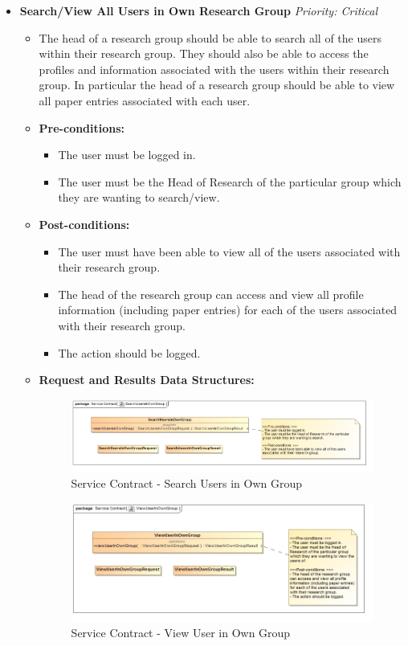 \documentclass{article}
\begin{document}
\begin{itemize}
					\cleardoublepage
					\item \textbf{Search/View All Users in Own Research Group} \hfill \textit{Priority: Critical}
					\begin{itemize}
						\item The head of a research group should be able to search all of the users within their research group. They should also be able to access the profiles and information associated with the users within their research group. In particular the head of a research group should be able to view all paper entries associated with each user.
						\item \textbf{Pre-conditions:}
						\begin{itemize}
							\item The user must be logged in.
							\item The user must be the Head of Research of the particular group which they are wanting to search/view.
						\end{itemize}
						\item \textbf{Post-conditions:}
						\begin{itemize}
							\item The user must have been able to view all of the users associated with their research group.
							\item The head of the research group can access and view all profile information (including paper entries) for each of the users associated with their research group.
							\item The action should be logged.
						\end{itemize}
						\item \textbf{Request and Results Data Structures:}
						\begin{figure}[H]
							\includegraphics[width=\linewidth]{../Diagrams/ServiceContracts/SearchUsersInOwnGroup.jpg}
							\caption{Service Contract - Search Users in Own Group}
						\end{figure}
						\begin{figure}[H]
							\includegraphics[width=\linewidth]{../Diagrams/ServiceContracts/ViewUserInOwnGroup.jpg}
							\caption{Service Contract - View User in Own Group}
						\end{figure}
					\end{itemize}
				\end{itemize}
				
\end{document}
